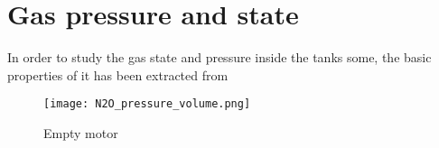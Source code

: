 
\section*{Gas pressure and state}

In order to study the gas state and pressure inside the tanks some, the basic
properties of it has been extracted from \cite{n2oReference}

\begin{figure}[H]
  \centering
  \texttt{[image: N2O\_pressure\_volume.png]}
  \caption{Empty motor}
  \label{fig:N2O_P_V_graph}
\end{figure}